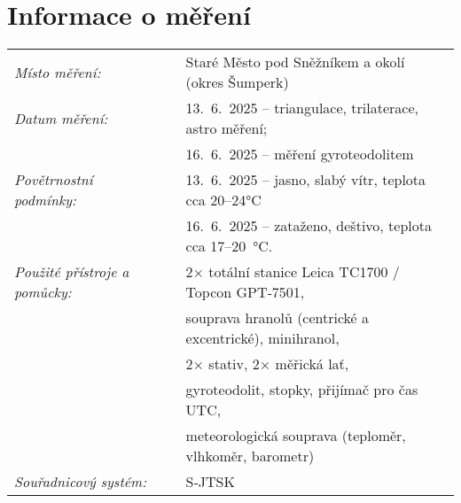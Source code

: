 \section{Informace o měření}
\begin{tabular}{lll} 
\textit{Místo měření:} & & Staré Město pod Sněžníkem a okolí (okres Šumperk)\\ 
\textit{Datum měření:} & & 13.~6.~2025 – triangulace, trilaterace, astro měření;\\
& & 16.~6.~2025 – měření gyroteodolitem\\
\textit{Povětrnostní podmínky:} & & 13.~6.~2025 – jasno, slabý vítr, teplota cca 20–24°C\\
 & & 16.~6.~2025 – zataženo, deštivo,  teplota cca 17–20~°C.\\
\textit{Použité přístroje a pomůcky:} & & 2× totální stanice Leica TC1700 / Topcon GPT‑7501,\\
& & souprava hranolů (centrické a excentrické), minihranol,\\
& & 2× stativ, 2× měřická lať,\\
& & gyroteodolit, stopky, přijímač pro čas UTC,\\
& & meteorologická souprava (teploměr, vlhkoměr, barometr)\\
\textit{Souřadnicový systém:} & & S‑JTSK\\ 
\end{tabular}
